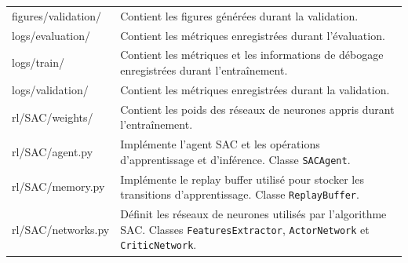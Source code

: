 \begin{longtable}{
        >{\ttfamily\small}p{}
        p{}
    }
    figures/validation/
                                             & Contient les figures générées durant la validation.                                                                                                                                                                                                 \\

    logs/evaluation/
                                             & Contient les métriques enregistrées durant l'évaluation.                                                                                                                                                                                            \\

    logs/train/
                                             & Contient les métriques et les informations de débogage enregistrées durant l'entraînement.                                                                                                                                                          \\

    logs/validation/
                                             & Contient les métriques enregistrées durant la validation.                                                                                                                                                                                           \\

    rl/SAC/weights/
                                             & Contient les poids des réseaux de neurones appris durant l'entraînement.                                                                                                                                                                            \\

    rl/SAC/agent.py
                                             & Implémente l'agent SAC et les opérations d'apprentissage et d'inférence. Classe \texttt{SACAgent}.

    \\

    rl/SAC/memory.py
                                             & Implémente le replay buffer utilisé pour stocker les transitions d'apprentissage. Classe \texttt{ReplayBuffer}.

    \\

    rl/SAC/networks.py
                                             & Définit les réseaux de neurones utilisés par l'algorithme SAC. Classes \texttt{FeaturesExtractor}, \texttt{ActorNetwork} et \texttt{CriticNetwork}.                                                                                                 \\


\end{longtable}
